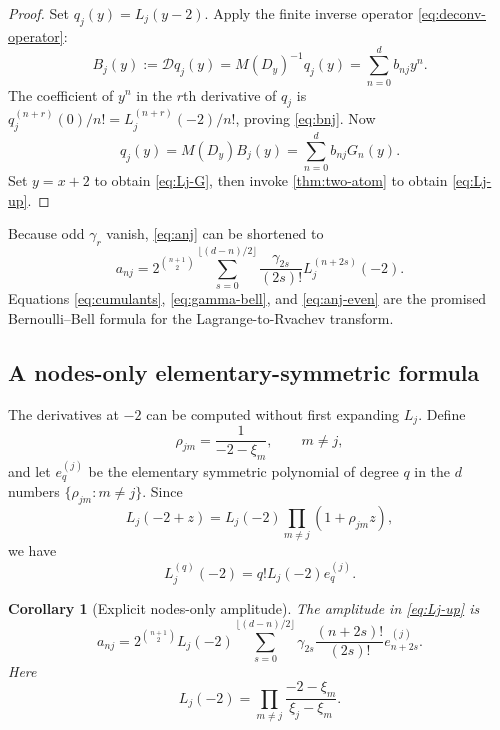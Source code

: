 \documentclass[11pt,oneside]{article}
\newtheorem{corollary}[theorem]{Corollary}
\theoremstyle{definition}
\theoremstyle{remark}
\newcommand{\cD}{\mathcal D}
\begin{document}
\begin{proof}
Set $q_j(y)=L_j(y-2)$.  Apply the finite inverse operator
\eqref{eq:deconv-operator}:
\begin{equation}
 B_j(y):=\cD q_j(y)=M(D_y)^{-1}q_j(y)=\sum_{n=0}^{d}b_{nj}y^n.
 \label{eq:Bj}
\end{equation}
The coefficient of $y^n$ in the $r$th derivative of $q_j$ is
$q_j^{(n+r)}(0)/n!=L_j^{(n+r)}(-2)/n!$, proving \eqref{eq:bnj}.
Now
\[
 q_j(y)=M(D_y)B_j(y)=\sum_{n=0}^{d}b_{nj}G_n(y).
\]
Set $y=x+2$ to obtain \eqref{eq:Lj-G}, then invoke
\cref{thm:two-atom} to obtain \eqref{eq:Lj-up}.
\end{proof}

Because odd $\gamma_r$ vanish, \eqref{eq:anj} can be shortened to
\begin{equation}
 a_{nj}=2^{\binom{n+1}{2}}
 \sum_{s=0}^{\lfloor(d-n)/2\rfloor}
 \frac{\gamma_{2s}}{(2s)!}L_j^{(n+2s)}(-2).
 \label{eq:anj-even}
\end{equation}
Equations \eqref{eq:cumulants}, \eqref{eq:gamma-bell}, and
\eqref{eq:anj-even} are the promised Bernoulli--Bell formula for the
Lagrange-to-Rvachev transform.

\subsection{A nodes-only elementary-symmetric formula}
The derivatives at $-2$ can be computed without first expanding $L_j$.
Define
\begin{equation}
 \rho_{jm}=\frac1{-2-\xi_m},\qquad m\ne j,
 \label{eq:rhojm}
\end{equation}
and let $e_q^{(j)}$ be the elementary symmetric polynomial of degree $q$ in
the $d$ numbers $\{\rho_{jm}:m\ne j\}$.  Since
\begin{equation}
 L_j(-2+z)=L_j(-2)\prod_{m\ne j}(1+\rho_{jm}z),
 \label{eq:Lj-product-anchor}
\end{equation}
we have
\begin{equation}
 L_j^{(q)}(-2)=q!L_j(-2)e_q^{(j)}.
 \label{eq:Lj-derivative-symmetric}
\end{equation}

\begin{corollary}[Explicit nodes-only amplitude]
\label{cor:nodes-only}
The amplitude in \eqref{eq:Lj-up} is
\begin{equation}
 a_{nj}=2^{\binom{n+1}{2}}L_j(-2)
 \sum_{s=0}^{\lfloor(d-n)/2\rfloor}
 \gamma_{2s}\frac{(n+2s)!}{(2s)!}e_{n+2s}^{(j)}.
 \label{eq:anj-nodes-only}
\end{equation}
Here
\begin{equation}
 L_j(-2)=\prod_{m\ne j}\frac{-2-\xi_m}{\xi_j-\xi_m}.
 \label{eq:Lj-minus2}
\end{equation}
\end{corollary}
\end{document}
